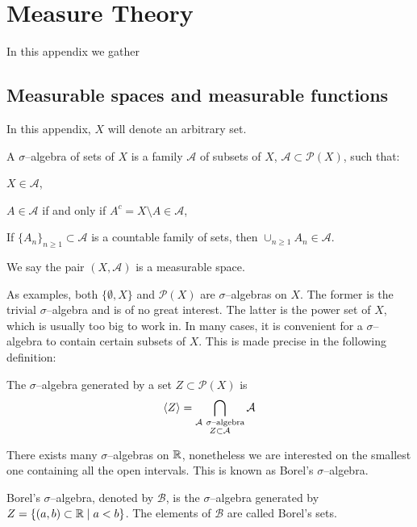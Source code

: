 
\section{Measure Theory} \label{ap:measure_theory}

In this appendix we gather 

\subsection{Measurable spaces and measurable functions}

In this appendix, $X$ will denote an arbitrary set.

\begin{definition*}
	A $\sigma$--algebra of sets of $X$ is a family $\mathcal{A}$ of subsets of $X$,
	$\mathcal{A} \subset \mathcal{P}(X)$, such that:
	\begin{enumeratedef}
		\item $X \in \mathcal{A}$,
		\item $A \in \mathcal{A}$ if and only if $A^c = X \setminus A \in \mathcal{A}$,
		\item If $\{ A_n \}_{n \geq 1} \subset \mathcal{A}$ is a countable
		family of sets, then $\cup_{n \geq 1} A_n \in \mathcal{A}$.
	\end{enumeratedef}
	We say the pair $(X, \mathcal{A})$ is a measurable space.
\end{definition*}

As examples, both $\{\emptyset, X\}$ and $\mathcal{P}(X)$ are $\sigma$--algebras
on $X$. The former is the trivial $\sigma$--algebra and is of no great interest.
The latter is the power set of $X$, which is usually too big to work in. In many
cases, it is convenient for a $\sigma$--algebra to contain certain subsets of
$X$. This is made precise in the following definition:

\begin{definition*}
	The $\sigma$--algebra generated by a set $Z \subset \mathcal{P}(X)$ is
	\[
		\langle Z \rangle = \bigcap_{\substack{\mathcal{A} \ \sigma\text{--algebra} \\ Z \subset \mathcal{A}}} \mathcal{A}	
	\]
\end{definition*}

There exists many $\sigma$--algebras on $\mathbb{R}$, nonetheless we are interested
on the smallest one containing all the open intervals. This is known as Borel's
$\sigma$--algebra.

\begin{definition*}
	Borel's $\sigma$--algebra, denoted by $\mathcal{B}$, is the
	$\sigma$--algebra generated by $Z = \{ (a,b) \subset \mathbb{R} \mid a < b \}$.
	The elements of $\mathcal{B}$ are called Borel's sets.
\end{definition*}

